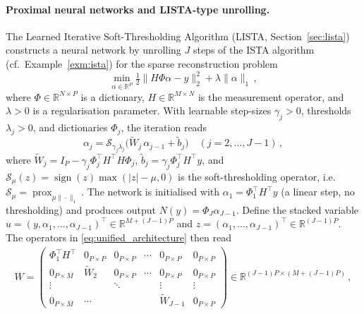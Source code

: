 \paragraph{Proximal neural networks and LISTA-type unrolling.}
The Learned Iterative Soft-Thresholding Algorithm (LISTA, Section~\ref{sec:lista}) constructs a neural network by unrolling $J$ steps of the ISTA algorithm (cf.\ Example~\ref{exm:ista}) for the sparse reconstruction problem
\begin{equation*}
    \min_{\alpha \in \mathbb{R}^P} \tfrac{1}{2}\|H\Phi\alpha - y\|_2^2 + \lambda\|\alpha\|_1 \, ,
\end{equation*}
where $\Phi \in \mathbb{R}^{N \times P}$ is a dictionary, $H \in \mathbb{R}^{M \times N}$ is the measurement operator, and $\lambda > 0$ is a regularisation parameter. With learnable step-sizes $\gamma_j > 0$, thresholds $\lambda_j > 0$, and dictionaries $\Phi_j$, the iteration reads
\begin{equation*}
    \alpha_j = \mathcal{S}_{\gamma_j\lambda_j}\!\bigl(\widetilde{W}_j\,\alpha_{j-1} + \tilde{b}_j\bigr) \quad (j=2,\ldots,J{-}1) \, ,
\end{equation*}
where $\widetilde{W}_j = I_P - \gamma_j \Phi_j^\top H^\top H \Phi_j$, $\tilde{b}_j = \gamma_j \Phi_j^\top H^\top y$, and $\mathcal{S}_\mu(z) = \operatorname{sign}(z)\max(|z|-\mu,0)$ is the soft-thresholding operator, i.e.\ $\mathcal{S}_\mu = \operatorname{prox}_{\mu\|\cdot\|_1}$. The network is initialised with $\alpha_1 = \Phi_1^\top H^\top y$ (a linear step, no thresholding) and produces output $N(y) = \Phi_J \alpha_{J-1}$. Define the stacked variable $u = (y, \alpha_1, \ldots, \alpha_{J-1})^\top \in \mathbb{R}^{M+(J-1)P}$ and $z = (\alpha_1, \ldots, \alpha_{J-1})^\top \in \mathbb{R}^{(J-1)P}$. The operators in \eqref{eq:unified_architecture} then read \cite{wang2025unified}
\begin{align*}
    W = \begin{pmatrix}
        \Phi_1^\top H^\top & 0_{P \times P} & 0_{P \times P} & \cdots & 0_{P \times P} & 0_{P \times P} \\
        0_{P \times M} & \widetilde{W}_2 & 0_{P \times P} & \cdots & 0_{P \times P} & 0_{P \times P} \\
        \vdots & & \ddots & & \vdots & \vdots \\
        0_{P \times M} & \cdots & & & \widetilde{W}_{J-1} & 0_{P \times P}
    \end{pmatrix} \in \mathbb{R}^{(J-1)P \times (M+(J-1)P)} \, ,
\end{align*}
